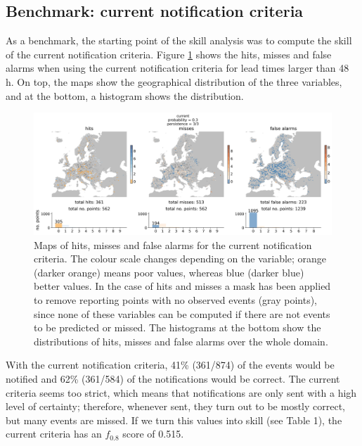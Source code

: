 \documentclass[preprint,12pt]{elsarticle}
\begin{document}
\subsection{Benchmark: current notification criteria}
\label{sec:benchmark}

As a benchmark, the starting point of the skill analysis was to compute the skill of the current notification criteria. Figure \ref{fig:benchmark} shows the hits, misses and false alarms when using the current notification criteria for lead times larger than 48 h. On top, the maps show the geographical distribution of the three variables, and at the bottom, a histogram shows the distribution.

\begin{figure}
    \centering
    \includegraphics[width=1\textwidth]{figures/hits_maps_reporting_points_2000km2_1239points_current_060h.jpg}
    \caption{Maps of hits, misses and false alarms for the current notification criteria. The colour scale changes depending on the variable; orange (darker orange) means poor values, whereas blue (darker blue) better values. In the case of hits and misses a mask has been applied to remove reporting points with no observed events (gray points), since none of these variables can be computed if there are not events to be predicted or missed. The histograms at the bottom show the distributions of hits, misses and false alarms over the whole domain.}
    \label{fig:benchmark}
\end{figure}

With the current notification criteria,  41\% (361/874) of the events would be notified and 62\% (361/584) of the notifications would be correct. The current criteria seems too strict, which means that notifications are only sent with a high level of certainty; therefore, whenever sent, they turn out to be mostly correct, but many events are missed. If we turn this values into skill (see Table 1), the current criteria  has an $f_{0.8}$ score of 0.515.
\end{document}
